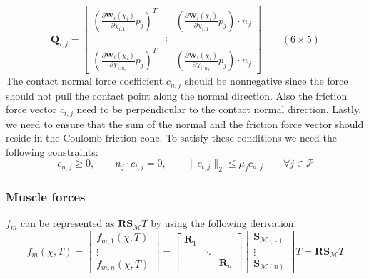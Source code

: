 \documentclass[a4paper,10pt]{article}
\begin{document}
\begin{equation}
\mathbf{Q}_{i,j} =
\left [
\begin{array}{ccc}
\left( \frac{\partial\mathbf{W}_i(\chi_{i})}{\partial\chi_{i,1}}p_j \right)^T &  &  \left( \frac{\partial\mathbf{W}_i(\chi_{i})}{\partial\chi_{i,1}}p_j \right) \cdot n_j \\
& \vdots & \\
\left( \frac{\partial\mathbf{W}_i(\chi_{i})}{\partial\chi_{i,n_d}}p_j \right)^T &  &  \left( \frac{\partial\mathbf{W}_i(\chi_{i})}{\partial\chi_{i,n_d}}p_j \right) \cdot n_j
\end{array}
\right ] \quad\quad (6 \times 5)
\end{equation}
The contact normal force coefficient $c_{n,j}$ should be nonnegative since the force
should not pull the contact point along the normal direction.
Also the friction force vector $c_{t,j}$ need to be perpendicular to
the contact normal direction. Lastly, we need to ensure that the sum of
the normal and the friction force vector should reside in the Coulomb friction cone.
To satisfy these conditions we need the following constraints:
\begin{equation}\label{Contact_force_constraints}
c_{n,j}           \geq  0,               \quad\quad
n_j \cdot c_{t,j}   =   0,               \quad\quad
\| c_{t,j} \|_2   \leq  \mu _j c_{n,j}   \quad\quad  \forall j \in \mathcal{P}
\end{equation}



\subsubsection{Muscle forces}
$f_m$ can be represented as $\mathbf{R}\mathbf{S}_\mathcal{M} T$ by using the following derivation.
\begin{equation}\label{f_m_lin}
f_m(\chi, T) = \left [
\begin{array}{c}
f_{m,1}(\chi, T )\\
\vdots\\
f_{m,n}(\chi, T )
\end{array}
\right ]
=
\left [
\begin{array}{ccc}
\mathbf{R}_1                      &            &                               \\
                                  &  \ddots    &                               \\
                                  &            & \mathbf{R}_n 
\end{array}
\right ]
\left [
\begin{array}{c}
\mathbf{S}_{\mathcal{M}(1)}  \\
\vdots  \\
\mathbf{S}_{\mathcal{M}(n)}
\end{array}
\right ]
T
=
\mathbf{R} \mathbf{S}_\mathcal{M} T
\end{equation}
\end{document}
